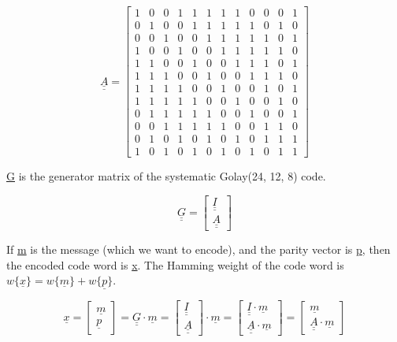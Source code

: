\documentclass[11pt,a4paper,oneside]{report}             %
\def\doubleunderline#1{\underline{\underline{#1}}}
\def\ul#1{\underline{#1}}
\begin{document}
\[
    \doubleunderline{A} = 
    \begin{bmatrix}
            1 & 0 & 0 & 1 & 1 & 1 & 1 & 1 & 0 & 0 & 0 & 1 \\
            0 & 1 & 0 & 0 & 1 & 1 & 1 & 1 & 1 & 0 & 1 & 0 \\
            0 & 0 & 1 & 0 & 0 & 1 & 1 & 1 & 1 & 1 & 0 & 1 \\
            1 & 0 & 0 & 1 & 0 & 0 & 1 & 1 & 1 & 1 & 1 & 0 \\
            1 & 1 & 0 & 0 & 1 & 0 & 0 & 1 & 1 & 1 & 0 & 1 \\
            1 & 1 & 1 & 0 & 0 & 1 & 0 & 0 & 1 & 1 & 1 & 0 \\
            1 & 1 & 1 & 1 & 0 & 0 & 1 & 0 & 0 & 1 & 0 & 1 \\
            1 & 1 & 1 & 1 & 1 & 0 & 0 & 1 & 0 & 0 & 1 & 0 \\
            0 & 1 & 1 & 1 & 1 & 1 & 0 & 0 & 1 & 0 & 0 & 1 \\
            0 & 0 & 1 & 1 & 1 & 1 & 1 & 0 & 0 & 1 & 1 & 0 \\
            0 & 1 & 0 & 1 & 0 & 1 & 0 & 1 & 0 & 1 & 1 & 1 \\
            1 & 0 & 1 & 0 & 1 & 0 & 1 & 0 & 1 & 0 & 1 & 1
    \end{bmatrix}
\]

\doubleunderline{G} is the generator matrix of the systematic Golay(24, 12, 8) code.

\[
    \doubleunderline{G} =
    \begin{bmatrix}
        \doubleunderline{I} \\
        \doubleunderline{A}
    \end{bmatrix}
\]

If \underline{m} is the message (which we want to encode), and the parity vector is \underline{p},
then the encoded code word is \underline{x}.
The Hamming weight of the code word is $w\{\ul{x}\} = w\{\ul{m}\} + w\{\ul{p}\}$.

\[
    \underline{x} = \begin{bmatrix}
        \underline{m} \\
        \underline{p}
    \end{bmatrix} = \doubleunderline{G} \cdot \underline{m} = \begin{bmatrix}
        \doubleunderline{I} \\
        \doubleunderline{A}
    \end{bmatrix} \cdot \underline{m} = \begin{bmatrix}
        \doubleunderline{I} \cdot \underline{m} \\
        \doubleunderline{A} \cdot \underline{m}
    \end{bmatrix} = \begin{bmatrix}
        \underline{m} \\
        \doubleunderline{A} \cdot \underline{m}
    \end{bmatrix}
\]
\end{document}
